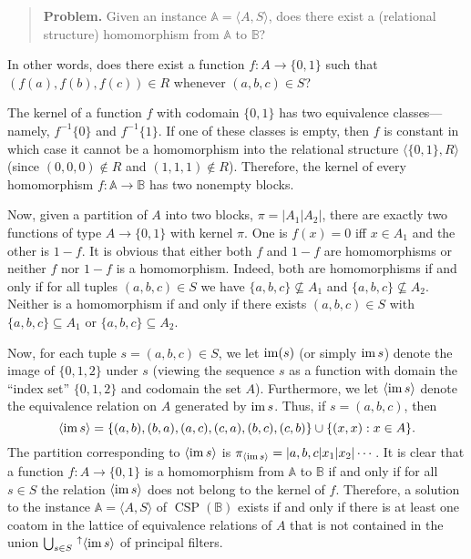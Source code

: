 \documentclass[12pt]{amsart}
\numberwithin{equation}{section}
\theoremstyle{plain}
\theoremstyle{definition}
\begin{document}
\begin{quote}
{\bf Problem.} Given an instance $\mathbb A = \langle A, S \rangle$,
does there exist a (relational structure) homomorphism from $\mathbb A$ to $\mathbb B$?
\end{quote}

In other words, does there exist a function
$f\colon A \rightarrow \{0,1\}$ such that $(f(a), f(b), f(c)) \in R$ whenever
$(a, b, c) \in S$?

The kernel of a function $f$ with codomain $\{0,1\}$ has two equivalence
classes---namely, $f^{-1}\{0\}$ and $f^{-1}\{1\}$.
If one of these classes is empty, then $f$ is constant 
in which case it cannot be a homomorphism into the relational structure
$\langle \{0, 1\}, R\rangle$ (since $(0,0,0)\notin R$ and $(1,1,1)\notin R$).
Therefore, the kernel of every homomorphism $f \colon \mathbb A \rightarrow \mathbb B$
has two nonempty blocks.

Now, given a partition of $A$ into two blocks, $\pi = |A_1|A_2|$,
there are exactly two functions of type $A \rightarrow \{0,1\}$
with kernel $\pi$. One is $f(x) = 0$ iff $x \in A_1$ and the other is $1-f$.
It is obvious that either both $f$ and $1-f$ are homomorphisms or neither $f$
nor $1-f$ is a homomorphism. Indeed, both are homomorphisms if and only if
for all tuples $(a,b,c) \in S$ we have $\{a,b,c\} \nsubseteq A_1$ and
$\{a,b,c\} \nsubseteq A_2$.
Neither is a homomorphism if and only if there exists
$(a,b,c) \in S$ with $\{a,b,c\} \subseteq A_1$ or
$\{a,b,c\} \subseteq A_2$.

Now, for each tuple $s = (a,b,c) \in S$, we let $\operatorname{im}(s)$ (or simply $\operatorname{im} s$)  denote the image of
$\{0,1,2\}$ under $s$ (viewing the sequence $s$ as a function with domain the 
``index set'' $\{0,1,2\}$ and codomain the set $A$).
Furthermore, we let $\langle \operatorname{im} s\rangle$ denote the equivalence relation on $A$
generated by $\operatorname{im} s$.  Thus, if $s = (a,b,c)$, then 
\[
\langle \operatorname{im} s \rangle = \{(a,b), (b,a), (a,c), (c,a), (b,c), (c,b)\} \cup \{(x,x) : x \in A\}.
\]
The partition corresponding to $\langle \operatorname{im} s \rangle$ is
$\pi_{\langle \operatorname{im} s\rangle} = |a, b, c|x_1|x_2|\cdots$.
It is clear that a function $f\colon A \rightarrow \{0, 1\}$ is a homomorphism from
$\mathbb A$ to $\mathbb B$ if and only if for all $s \in S$
the relation $\langle \operatorname{im} s\rangle$ does not belong to the kernel of $f$.
Therefore, a solution to the instance $\mathbb A = \langle A, S \rangle$ of
$\operatorname{CSP}(\mathbb B)$ exists if and only if there is at least one coatom
in the lattice of equivalence relations of $A$ that is not contained in the union
$ \bigcup_{s\in S} \, ^\uparrow\langle \operatorname{im} s \rangle $ of principal filters.
\end{document}
